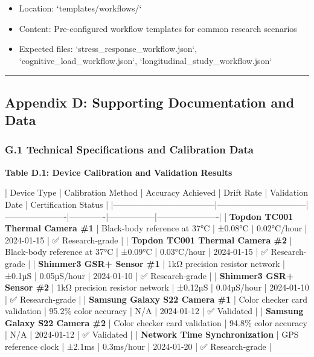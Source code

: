 \documentclass[11pt,a4paper]{article}
\begin{document}
\begin{itemize}
\item Location: `templates/workflows/`
\item Content: Pre-configured workflow templates for common research scenarios
\item Expected files: `stress_response_workflow.json`, `cognitive_load_workflow.json`, `longitudinal_study_workflow.json`

\end{itemize}
\hrule

\subsection{Appendix D: Supporting Documentation and Data}

\subsubsection{G.1 Technical Specifications and Calibration Data}

\textbf{Table D.1: Device Calibration and Validation Results}

| Device Type                        | Calibration Method             | Accuracy Achieved    | Drift Rate  | Validation Date | Certification Status |
|------------------------------------|--------------------------------|----------------------|-------------|-----------------|----------------------|
| \textbf{Topdon TC001 Thermal Camera \#1} | Black-body reference at 37°C   | ±0.08°C              | 0.02°C/hour | 2024-01-15      | ✅ Research-grade     |
| \textbf{Topdon TC001 Thermal Camera \#2} | Black-body reference at 37°C   | ±0.09°C              | 0.03°C/hour | 2024-01-15      | ✅ Research-grade     |
| \textbf{Shimmer3 GSR+ Sensor \#1}        | 1kΩ precision resistor network | ±0.1µS               | 0.05µS/hour | 2024-01-10      | ✅ Research-grade     |
| \textbf{Shimmer3 GSR+ Sensor \#2}        | 1kΩ precision resistor network | ±0.12µS              | 0.04µS/hour | 2024-01-10      | ✅ Research-grade     |
| \textbf{Samsung Galaxy S22 Camera \#1}   | Color checker card validation  | 95.2\% color accuracy | N/A         | 2024-01-12      | ✅ Validated          |
| \textbf{Samsung Galaxy S22 Camera \#2}   | Color checker card validation  | 94.8\% color accuracy | N/A         | 2024-01-12      | ✅ Validated          |
| \textbf{Network Time Synchronization}   | GPS reference clock            | ±2.1ms               | 0.3ms/hour  | 2024-01-20      | ✅ Research-grade     |
\end{document}

